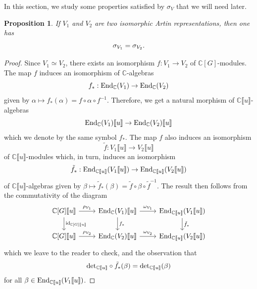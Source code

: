 \documentclass[11pt]{amsart}
\newtheorem{proposition}[theorem]{Proposition}
\numberwithin{equation}{section}
\theoremstyle{remark}
\theoremstyle{definition}
\begin{document}
In this section, we study some properties satisfied by $\sigma_{V}$ that we will need later.
\begin{proposition} \label{det_up_to_iso}
If $V_{1}$ and $V_{2}$ are two isomorphic Artin representations, then one has
$${\rm \sigma}_{V_{1}} = {\rm \sigma}_{V_{2}}. $$
\end{proposition}
\begin{proof}
Since $V_{1} \simeq V_{2}$, there exists an isomorphism $f:V_{1} \rightarrow V_{2}$ of $\mathbb{C}[G]$-modules.  The map $f$ induces an isomorphism of $\mathbb{C}$-algebras 
$$f_{*}:{\rm End}_{\mathbb{C}}(V_{1}) \rightarrow {\rm End}_{\mathbb{C}}(V_{2}) $$
given by $\alpha \mapsto f_{*}(\alpha) = f \circ \alpha \circ f^{-1}$.  Therefore, we get a natural morphism of $\mathbb{C}\llbracket u \rrbracket$-algebras 
$${\rm End}_{\mathbb{C}}(V_{1})\llbracket u \rrbracket \rightarrow {\rm End}_{\mathbb{C}}(V_{2}) \llbracket u \rrbracket $$
which we denote by the same symbol $f_{*}$.  The map $f$ also induces an isomorphism 
$$\tilde{f}:V_{1}\llbracket u \rrbracket \rightarrow V_{2} \llbracket u \rrbracket$$ 
of $\mathbb{C}\llbracket u \rrbracket$-modules which, in turn, induces an isomorphism
$$\tilde{f}_{*}:{\rm End}_{\mathbb{C}\llbracket u \rrbracket}(V_{1}\llbracket u \rrbracket) \rightarrow {\rm End}_{\mathbb{C}\llbracket u \rrbracket}(V_{2}\llbracket u \rrbracket) $$
of $\mathbb{C}\llbracket u \rrbracket$-algebras given by $\beta \mapsto \tilde{f}_{*}(\beta) = \tilde{f} \circ \beta \circ \tilde{f}^{-1}$.  The result then follows from the commutativity of the diagram
\begin{equation*}
\begin{tikzcd}
\mathbb{C}[G]\llbracket u \rrbracket \arrow["{\rm id}_{\mathbb{C}[G]\llbracket u \rrbracket}",d] \arrow["\rho_{V_{1}}",r] & {\rm End}_{\mathbb{C}}(V_{1})\llbracket u \rrbracket \arrow["f_{*}",d] \arrow["\omega_{V_{1}}",r] & {\rm End}_{\mathbb{C}\llbracket u \rrbracket}(V_{1}\llbracket u \rrbracket) \arrow["\tilde{f}_{*}",d]\\
\mathbb{C}[G]\llbracket u \rrbracket \arrow["\rho_{V_{2}}",r] & {\rm End}_{\mathbb{C}}(V_{2})\llbracket u \rrbracket \arrow["\omega_{V_{2}}",r] & {\rm End}_{\mathbb{C}\llbracket u \rrbracket}(V_{2}\llbracket u \rrbracket)
\end{tikzcd}
\end{equation*}
which we leave to the reader to check, and the observation that 
$${\rm det}_{\mathbb{C}\llbracket u \rrbracket} \circ \tilde{f}_{*} (\beta) = {\rm det}_{\mathbb{C}\llbracket u \rrbracket}(\beta) $$
for all $\beta \in {\rm End}_{\mathbb{C}\llbracket u \rrbracket}(V_{1}\llbracket u \rrbracket)$.
\end{proof}
\end{document}

